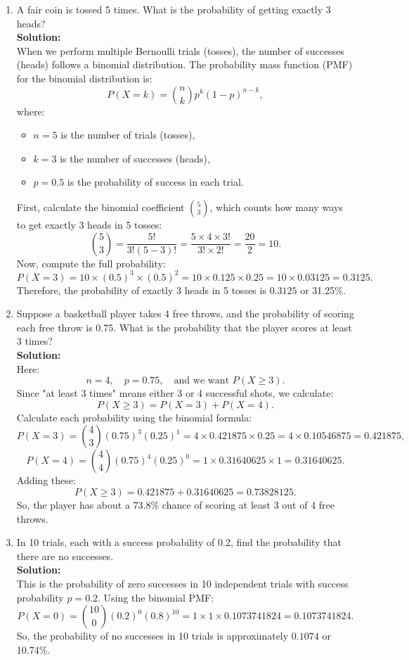 \documentclass{book}
\begin{document}
\begin{enumerate}[label=Exercise \arabic*:]
    \item A fair coin is tossed 5 times. What is the probability of getting exactly 3 heads? \\
    \textbf{Solution:} \\
    When we perform multiple Bernoulli trials (tosses), the number of successes (heads) follows a binomial distribution. The probability mass function (PMF) for the binomial distribution is:
    \[
    P(X = k) = \binom{n}{k} p^k (1-p)^{n-k},
    \]
    where:
    \begin{itemize}
        \item \(n = 5\) is the number of trials (tosses),
        \item \(k = 3\) is the number of successes (heads),
        \item \(p = 0.5\) is the probability of success in each trial.
    \end{itemize}
    First, calculate the binomial coefficient \(\binom{5}{3}\), which counts how many ways to get exactly 3 heads in 5 tosses:
    \[
    \binom{5}{3} = \frac{5!}{3! (5-3)!} = \frac{5 \times 4 \times 3!}{3! \times 2!} = \frac{20}{2} = 10.
    \]
    Now, compute the full probability:
    \[
    P(X=3) = 10 \times (0.5)^3 \times (0.5)^2 = 10 \times 0.125 \times 0.25 = 10 \times 0.03125 = 0.3125.
    \]
    Therefore, the probability of exactly 3 heads in 5 tosses is \(\boxed{0.3125}\) or 31.25\%.

    \item Suppose a basketball player takes 4 free throws, and the probability of scoring each free throw is 0.75. What is the probability that the player scores at least 3 times? \\
    \textbf{Solution:} \\
    Here:
    \[
    n = 4, \quad p = 0.75, \quad \text{and we want } P(X \geq 3).
    \]
    Since "at least 3 times" means either 3 or 4 successful shots, we calculate:
    \[
    P(X \geq 3) = P(X=3) + P(X=4).
    \]
    Calculate each probability using the binomial formula:
    \[
    P(X=3) = \binom{4}{3} (0.75)^3 (0.25)^1 = 4 \times 0.421875 \times 0.25 = 4 \times 0.10546875 = 0.421875,
    \]
    \[
    P(X=4) = \binom{4}{4} (0.75)^4 (0.25)^0 = 1 \times 0.31640625 \times 1 = 0.31640625.
    \]
    Adding these:
    \[
    P(X \geq 3) = 0.421875 + 0.31640625 = 0.73828125.
    \]
    So, the player has about a \(\boxed{73.8\%}\) chance of scoring at least 3 out of 4 free throws.

    \item In 10 trials, each with a success probability of 0.2, find the probability that there are no successes. \\
    \textbf{Solution:} \\
    This is the probability of zero successes in 10 independent trials with success probability \(p=0.2\). Using the binomial PMF:
    \[
    P(X=0) = \binom{10}{0} (0.2)^0 (0.8)^{10} = 1 \times 1 \times 0.1073741824 = 0.1073741824.
    \]
    So, the probability of no successes in 10 trials is approximately \(\boxed{0.1074}\) or 10.74\%.
\end{enumerate}
\end{document}
